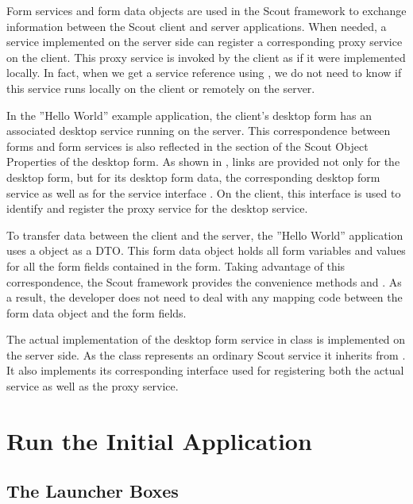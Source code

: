 \documentclass[a4paper,10pt,twoside]{book}
\begin{document}
Form services and form data objects are used in the Scout framework to exchange information between the Scout client and server applications.
When needed, a service implemented on the server side can register a corresponding proxy service on the client.
This proxy service is invoked by the client as if it were implemented locally.
In fact, when we get a service reference using , we do not need to know if this service runs locally on the client or remotely on the server.

In the ''Hello World'' example application, the client's desktop form has an associated desktop service running on the server.
This correspondence between forms and form services is also reflected in the  section of the Scout Object Properties of the desktop form.
As shown in , links are provided not only for the desktop form, but for its desktop form data, the corresponding desktop form service as well as for the service interface . 
On the client, this interface is used to identify and register the proxy service for the desktop service.

To transfer data between the client and the server, the ''Hello World'' application uses a  object as a DTO.
This form data object holds all form variables and values for all the form fields contained in the form.
Taking advantage of this correspondence, the Scout framework provides the convenience methods  and .
As a result, the developer does not need to deal with any mapping code between the form data object and the form fields.

The actual implementation of the desktop form service in class  is implemented on the server side.
As the class  represents an ordinary Scout service it inherits from .
It also implements its corresponding  interface used for registering both the actual service as well as the proxy service.

\section{Run the Initial Application}

\subsection{The Launcher Boxes}
\end{document}
